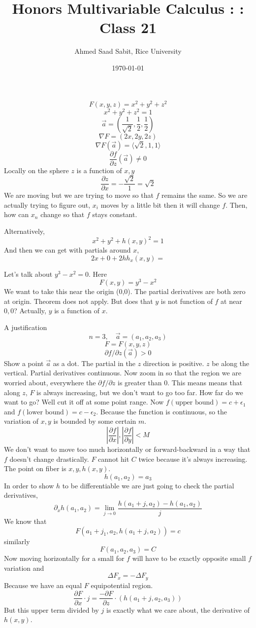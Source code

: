 \documentclass[letter]{article}
\title{Honors Multivariable Calculus : : Class 21}
\author{Ahmed Saad Sabit, Rice University}
\date{\today}
\begin{document}
\maketitle
\[
F(x,y,z) = x^2 + y^2 + z^2
\] 
\[
x^2 + y^2 + z^2 = 1
\] 
\[
\vec{a} = \left(\frac{1}{\sqrt{2} }, \frac{1}{2}, \frac{1}{2}\right)
\]
\[
\nabla F = \left(2x , 2y, 2z\right)
\] 
\[
\nabla F(\vec{a}) = \langle \sqrt{2} , 1 , 1 \rangle 
\] 
\[
\frac{\partial f}{\partial z} (\vec{a}) \neq 0 
\] 
Locally on the sphere $z$ is a function of $x,y$ 
\[
\frac{\partial z}{\partial x} = - \frac{\sqrt{2} }{1} = \sqrt{2} 
\] 
We are moving but we are trying to move so that $f$ remains the same. So we are actually trying to figure out, $x_i$ moves by a little bit then it will change $f$. Then, how can $x_n$ change so that $f$ stays constant. 

Alternatively, 
\[
x^2 + y^2 + h(x,y) ^2 = 1
\] And then we can get with partials around $x$, 
\[
2x + 0 + 2 h h_x(x,y) = 
\]

Let's talk about $y^3 - x^2 = 0$. Here 
\[
F(x,y) = y^3 - x^2 
\] We want to take this near the origin (0,0). The partial derivatives are both zero at origin. Theorem does not apply. But does that $y$ is not function of $ f$ at near $0,0$? Actually, $y$ is a function of $x$. 

A justification 
\[
n = 3, \quad \vec{a} = (a_1, a_2, a_3)
\] 
\[
F = F(x,y,z) 
\] 
\[
\partial f / \partial z (\vec{a}) > 0 
\] 
Show a point $\vec{a}$ as a dot. The partial in the $z$ direction is positive. $z$ be along the vertical. Partial derivatives continuous. Now zoom in so that the region we are worried about, everywhere the $\partial f /\partial z$ is greater than 0. This means means that along $z$, $F$ is always increasing, but we don't want to go too far. How far do we want to go? Well cut it off at some point range. Now $f(\text{upper bound})  = c + \epsilon_1$ and $f (\text{lower bound}) = c - \epsilon_2$. Because the function is continuous, so the variation of $x,y$ is bounded by some certain $m$.
\[
\left| \frac{\partial f}{\partial x} \right|, \left| \frac{\partial f}{\partial y} \right| < M
\] 
We don't want to move too much horizontally or forward-backward in a way that $f$ doesn't change drastically. $F$ cannot hit $C$ twice because it's always increasing. The point on fiber is $x,y, h(x,y)$. 
\[
h(a_1,a_2) = a_3
\] 
In order to show $h$ to be differentiable we are just going to check the partial derivatives, 
\[
\partial _x h (a_1, a_2) = \lim_{j \to 0} \frac{h(a_1 + j, a_2) - h(a_1, a_2)}{j}
\]
We know that $$F(a_1 + j_1 , a_2, h(a_1 + j, a_2)) = c$$ similarly 
\[
F(a_1, a_2, a_3) = C
\]
Now moving horizontally for a small for $f$ will have to be exactly opposite small $f$ variation and 
\[
\Delta F_x = - \Delta F_y
\]  
Because we have an equal $F$ equipotential region.
\[
\frac{\partial F}{\partial x} \cdot  j = 
\frac{- \partial F}{\partial z} \cdot \left(h(a_1 + j, a_2, a_3)\right)
\] 
But this upper term divided by $j$ is exactly what we care about, the derivative of $h(x,y)$. 
\end{document}
